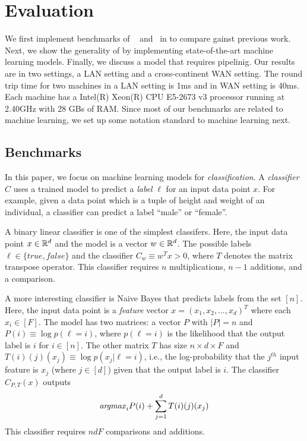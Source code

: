 \section{Evaluation}
\label{sec:eval}

We first implement benchmarks of ~\cite{shafindss} and~\cite{minionn} in \tool to compare gainst 
previous work.
Next, we show the generality of \tool by implementing state-of-the-art machine learning models.
Finally, we discuss a model that requires pipelinig.
Our results are in two settings, a LAN setting and a cross-continent WAN setting.
The round trip time for two machines in a LAN setting is 1ms and in WAN setting is 40ms.
Each machine has a Intel(R) Xeon(R) CPU E5-2673 v3 processor running at 2.40GHz with
28 GBs of RAM. Since most of our benchmarks are related to machine learning,
we set up some notation standard to machine learning next.

\subsection{Benchmarks}
In this paper, we focus on machine learning models for {\it classification}.
A {\it classifier} $C$ uses a trained model to predict a {\it label} $\ell$ for an input data point $x$. For example, given a data point which is a tuple of height and weight of an individual,
a classifier can predict a label ``male'' or ``female''.

A binary linear classifier is one of the simplest classifers. Here, the input data point $x\in{\mathbb{R}}^d$
and the model is a vector $w\in{\mathbb{R}}^d$. The possible labels $\ell\in\{\mathit{true},\mathit{false}\}$
and the classifier $C_w\equiv w^Tx>0$, where $T$ denotes the matrix transpose operator.
This classifier requires $n$ multiplications, $n-1$ additions, and a comparison.

A more interesting classifier is Naive Bayes that predicts labels from the set $[n]$.
Here, the input data point is a {\it feature}
vector $x=(x_1,x_2,\ldots,x_d)^T$ where each $x_i\in [F]$.
The model has two matrices: a vector $P$ with $|P|=n$ and $P(i) \equiv \log p(\ell=i)$, where $p(\ell=i)$ is the likelihood that the output label is $i$ for $i\in[n]$.
The other matrix $T$ has size $n\times d\times F$ and $T(i)(j)(x_j)\equiv\log p(x_j|\ell=i)$, i.e., the log-probability that 
the $j^{th}$ input feature is $x_j$ (where $j\in [d]$) given that the output label is $i$.
The classifier $C_{P,T}(x)$ outputs
\[
{\it argmax}_i P(i)+\sum_{j=1}^d T(i)(j)(x_j)
\]
This classifier requires $ndF$ comparisons and additions.

